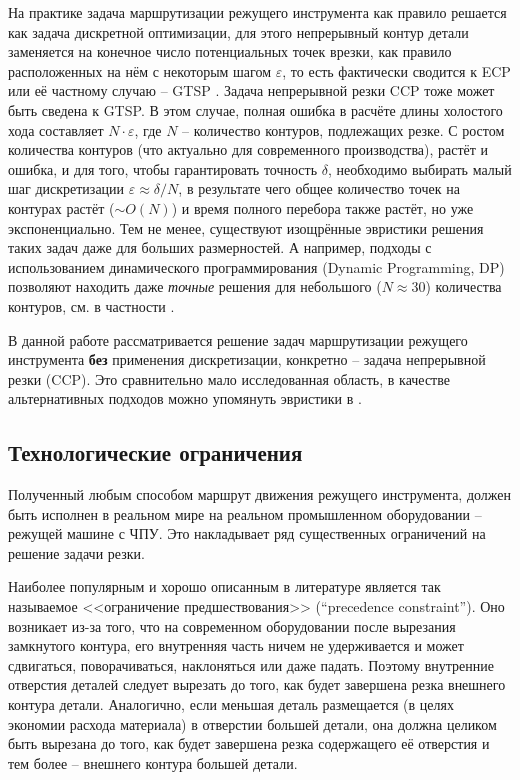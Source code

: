\documentclass[14pt]{extarticle}
\theoremstyle{plain}%
\theoremstyle{remark}
\begin{document}
На практике
задача маршрутизации режущего инструмента
как правило решается
как задача дискретной оптимизации,
для этого непрерывный контур детали
заменяется на конечное число
потенциальных точек врезки,
как правило расположенных на нём
с некоторым шагом
$\varepsilon$,
то есть фактически сводится к
ECP
\cite{bi04,bi05,bi06}
или её частному случаю --
GTSP
\cite{bi07,bi08,bi09,bi10}.
Задача непрерывной резки
CCP
тоже может быть сведена к
GTSP.
В этом случае,
полная ошибка в расчёте длины холостого хода
составляет
$N \cdot \varepsilon$,
где
$N$
-- количество контуров,
подлежащих резке.
С ростом количества контуров
(что актуально для современного производства),
растёт и ошибка,
и для того,
чтобы гарантировать точность
$\delta$,
необходимо выбирать малый шаг дискретизации
$\varepsilon \approx \delta / N$,
в результате чего
общее количество точек на контурах растёт
($\sim O (N)$)
и время полного перебора также растёт,
но уже экспоненциально.
Тем не менее,
существуют изощрённые эвристики
решения таких задач даже для больших размерностей.
А например,
подходы с использованием
динамического программирования
(Dynamic Programming, DP)
позволяют находить даже
\textit{точные}
решения для небольшого
($N \approx 30$)
количества контуров,
см. в частности
\cite{bi15}.

В данной работе рассматривается
решение задач маршрутизации режущего инструмента
\textbf{без}
применения дискретизации,
конкретно --
задача непрерывной резки
(CCP).
Это сравнительно мало исследованная область,
в качестве альтернативных подходов
можно упомянуть эвристики в
\cite{bi11,bi12}.

\subsection{Технологические ограничения}

Полученный любым способом
маршрут движения режущего инструмента,
должен быть исполнен в реальном мире
на реальном промышленном оборудовании --
режущей машине с ЧПУ.
Это накладывает ряд
существенных ограничений
на решение задачи резки.

Наиболее популярным и хорошо описанным в литературе
является так называемое
<<ограничение предшествования>>
(``precedence constraint'').
Оно возникает из-за того,
что
на современном оборудовании
после вырезания замкнутого контура,
его внутренняя часть ничем не удерживается
и может сдвигаться, поворачиваться, наклоняться
или даже падать.
Поэтому внутренние отверстия деталей следует
вырезать до того,
как будет завершена резка
внешнего контура детали.
Аналогично,
если меньшая деталь размещается
(в целях экономии расхода материала)
в отверстии большей детали,
она должна целиком быть вырезана
до того,
как будет завершена резка
содержащего её отверстия
и тем более --
внешнего контура большей детали.
\end{document}

